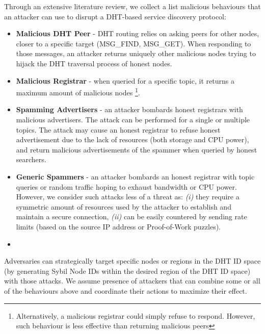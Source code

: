 
Through an extensive literature review\cite{chen2020survey, henningsen2019eclipsing}, we collect a list malicious behaviours that an attacker can use to disrupt a DHT-based service discovery protocol:
\begin{itemize}
    \item \textbf{Malicious DHT Peer} - DHT routing relies on asking peers for other nodes, closer to a specific target (\eg MSG\_FIND, MSG\_GET). When responding to those messages, an attacker returns uniquely other malicious nodes trying to hijack the DHT traversal process of honest nodes.
    \item \textbf{Malicious Registrar} - when queried for a specific topic, it returns a maximum amount of malicious nodes \footnote{Alternatively, a malicious registrar could simply refuse to respond. However, such behaviour is less effective than returning malicious peers}. 
    \item \textbf{Spamming Advertisers} - an attacker bombards honest registrars with malicious advertisers. The attack can be performed for a single or multiple topics. The attack may cause an honest registrar to refuse honest advertisement due to the lack of resources (both storage and CPU power), and return malicious advertisements of the spammer when queried by honest searchers. 
    \item \textbf{Generic Spammers} - an attacker bombards an honest registrar with topic queries or random traffic hoping to exhaust bandwidth or CPU power. However, we consider such attacks less of a threat as: \textit{(i)} they require a symmetric amount of resources used by the attacker to establish and maintain a secure connection, \textit{(ii)} can be easily countered by sending rate limits (\eg based on the source IP address or Proof-of-Work puzzles). 
    \item {}
\end{itemize}

Adversaries can strategically target specific nodes or regions in the DHT ID space (\ie by generating Sybil Node IDs within the desired region of the DHT ID space) with those attacks. We assume presence of attackers that can combine some or all of the behaviours above and coordinate their actions to maximize their effect. 

